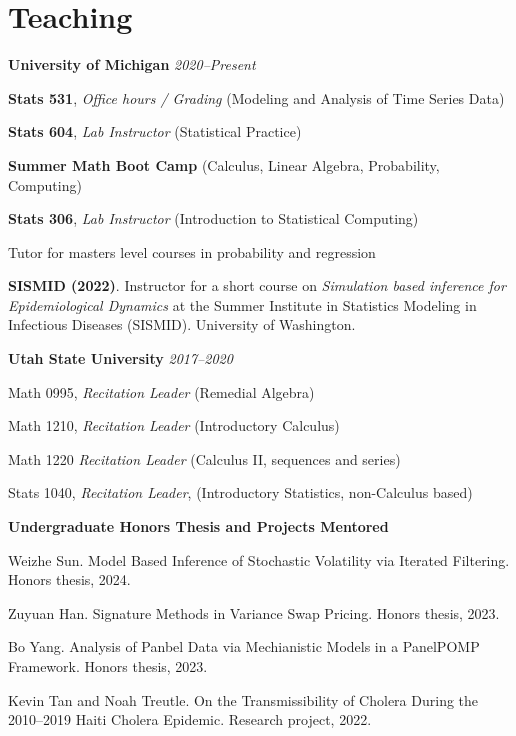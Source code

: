 \documentclass[11pt] {article}
\newenvironment {reflist}
                {
                 \begin{list}{}
                 {\setlength{\labelwidth}{0mm}
                  \setlength{\leftmargin}{8mm}
                  \setlength{\itemindent}{-3mm}
                  \setlength{\labelsep}{0mm}
                  \setlength{\parsep}{0.1 ex}
                  \setlength{\itemsep}{0.1cm}
      \setlength{\topsep}{0.15cm}}} %
   {\end{list}}
\newenvironment {teachinglsit}
                {
                 \begin{list}{}
                 {\setlength{\labelwidth}{0mm}
                  \setlength{\leftmargin}{5mm}
                  \setlength{\labelsep}{0mm}
                  \setlength{\parsep}{0.1 ex}
                  \setlength{\itemsep}{1pt}
      \setlength{\topsep}{0.15cm}}} %
   {\end{list}}
\begin{document}
\hspace{5mm}{\it Award amount: $\$1000$}

\section*{Teaching}

\noindent \textbf{University of Michigan} \hfill  {\textit{2020--Present}}

\begin{teachinglsit}
    \item \textbf{Stats 531}, {\it Office hours / Grading} \hfill (Modeling and Analysis of Time Series Data)
    \item \textbf{Stats 604}, {\it Lab Instructor} \hfill (Statistical Practice)
    \item \textbf{Summer Math Boot Camp} \hfill (Calculus, Linear Algebra, Probability, Computing)
    \item \textbf{Stats 306}, {\it Lab Instructor} \hfill (Introduction to Statistical Computing)

    \item Tutor for masters level courses in probability and regression
\end{teachinglsit}

\vspace{2mm}
\noindent \textbf{SISMID (2022)}. Instructor for a short course on {\it Simulation based inference for Epidemiological Dynamics} at the Summer Institute in Statistics Modeling in Infectious Diseases (SISMID). University of Washington.

\vspace{2mm}
\noindent \textbf{Utah State University} \hfill  {\textit{2017--2020}}

\begin{teachinglsit}
    \item Math 0995, {\it Recitation Leader} (Remedial Algebra)
    \item Math 1210, {\it Recitation Leader} (Introductory Calculus)
    \item Math 1220 {\it Recitation Leader} (Calculus II, sequences and series)
    \item Stats 1040, {\it Recitation Leader}, (Introductory Statistics, non-Calculus based)
\end{teachinglsit}

\noindent \textbf{Undergraduate Honors Thesis and Projects Mentored}

\begin{reflist}

  \item Weizhe Sun. Model Based Inference of Stochastic Volatility via Iterated Filtering. Honors thesis, 2024.
  \item Zuyuan Han. Signature Methods in Variance Swap Pricing. Honors thesis, 2023.
  \item Bo Yang. Analysis of Panbel Data via Mechianistic Models in a PanelPOMP Framework. Honors thesis, 2023.
  \item Kevin Tan and Noah Treutle. On the Transmissibility of Cholera During the 2010--2019 Haiti Cholera Epidemic. Research project, 2022.

\end{reflist}
\end{document}
